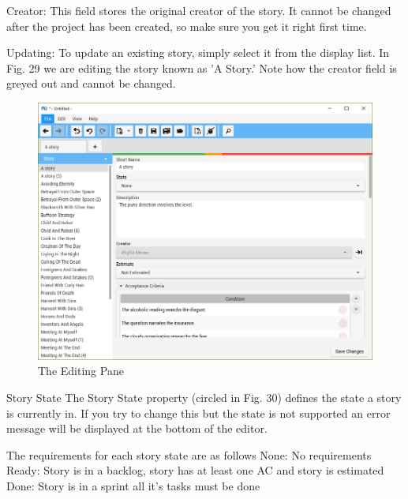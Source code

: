 Creator:
This field stores the original creator of the story. It cannot be changed after the project has been created, so make sure you get it right first time.

Updating:
To update an existing story, simply select it from the display list. In Fig. 29 we are editing the story known as 'A Story.' Note how the creator field is greyed out and cannot be changed.

\begin{figure}[H]
\centering
\includegraphics[width=\textwidth]{images/screenshots/stories3.PNG}
\caption{The Editing Pane}
\label{fig:new_project}
\end{figure}

Story State\newline
The Story State property (circled in Fig. 30) defines the state a story is currently in. If you try to change this but the state is not supported an error message will be displayed at the bottom of the editor. \newline

The requirements for each story state are as follows\newline
None: No requirements\newline
Ready: Story is in a backlog, story has at least one AC and story is estimated
Done: Story is in a sprint all it's tasks must be done

